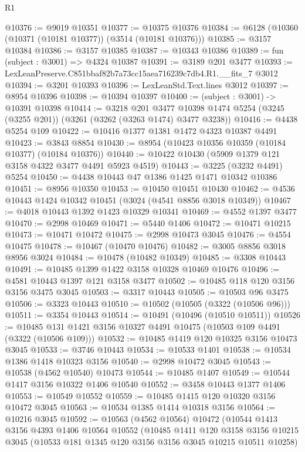 \begin{lexlean}{R1}
\begin{coremodule}
@10376 := @9019 @10351
@10377 := @10375 @10376
@10384 := @6128 (@10360 (@10371 (@10181 @10377)) (@3514 (@10181 @10376)))
@10385 := @3157 @10384
@10386 := @3157 @10385
@10387 := @10343 @10386
@10389 := fun (subject : @3001) => @4324 @10387
@10391 := @3189 @201 @3477
@10393 := LexLeanPreserve.C851bbaf82b7a73cc15aea716239c7db4.R1.__fits_7 @3012
@10394 := @3201 @10393
@10396 := LexLeanStd.Text.lines @3012
@10397 := @8954 @10396
@10398 := @10394 @10397
@10400 := (subject : @3001) -> @10391 @10398
@10414 := @3218
    @201
    @3477
    @10398
    @1474
    @5254
    (@3245 (@3255 @201))
    (@3261 (@3262 (@3263 @1474) @3477 @3238))
@10416 := @4438 @5254 @109
@10422 := @10416 @1377 @1381 @1472 @4323 @10387 @4491
@10423 := @3843 @8854
@10430 := @8954 (@10423 @10356 @10359 (@10184 @10377) (@10184 @10376))
@10440 := @10422 @10430 (@5909 @1379 @121 @3158 @4322 @3477 @4491 @5923 @4519)
@10443 := @3225 (@3232 @4491) @5254
@10450 := @4438 @10443 @47 @1386 @1425 @1471 @10342 @10386
@10451 := @8956 @10350
@10453 := @10450 @10451 @10430
@10462 := @4536 @10443 @1424 @10342 @10451 (@3024 (@4541 @8856 @3018 @10349))
@10467 := @4018 @10443 @1392 @1423 @10329 @10341
@10469 := @4552 @1397 @3477
@10470 := @2998 @10469
@10471 := @5440 @1406
@10472 := @10471 @10215
@10473 := @10471 @10472
@10475 := @2998 @10473 @3045
@10476 := @4554 @10475
@10478 := @10467 (@10470 @10476)
@10482 := @3005 @8856 @3018 @8956 @3024
@10484 := @10478 (@10482 @10349)
@10485 := @3308 @10443
@10491 := @10485 @1399 @1422 @3158 @10328 @10469 @10476
@10496 := @4581 @10443 @1397 @121 @3158 @3477
@10502 := @10485 @118 @120 @3156 @3156 @3475 @3045
@10503 := @3317 @10443
@10505 := @10503 @96 @3475
@10506 := @3323 @10443
@10510 := @10502 (@10505 (@3322 (@10506 @96)))
@10511 := @3354 @10443
@10514 := @10491 (@10496 (@10510 @10511))
@10526 := @10485 @131 @1421 @3156 @10327 @4491 @10475 (@10503 @109 @4491 (@3322 (@10506 @109)))
@10532 := @10485 @1419 @120 @10325 @3156 @10473 @3045
@10533 := @3746 @10443
@10534 := @10533 @1401
@10538 := @10534 @1386 @1418 @10323 @3156
@10540 := @2998 @10472 @3045
@10543 := @10538 (@4562 @10540) @10473
@10544 := @10485 @1407
@10549 := @10544 @1417 @3156 @10322 @1406 @10540
@10552 := @3458 @10443 @1377 @1406
@10553 := @10549 @10552
@10559 := @10485 @1415 @120 @10320 @3156 @10472 @3045
@10563 := @10534 @1385 @1414 @10318 @3156
@10564 := @10216 @3045
@10592 := @10563
    (@4562 @10564)
    @10472
    (@10544
      @1413
      @3156
      @4393
      @1406
      @10564
      @10552
      (@10485
        @1411
        @120
        @3158
        @3156
        @10215
        @3045
        (@10533 @181 @1345 @120 @3156 @3156 @3045 @10215 @10511 @10258)

\end{coremodule}
\end{lexlean}
